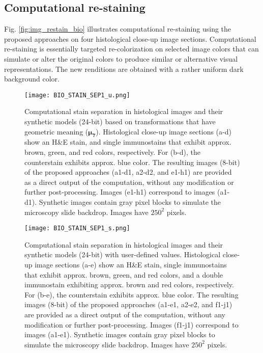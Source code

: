 \documentclass[superscriptaddress,longbibliography,aps,prl,twocolumn,10pt]{revtex4-2}
\begin{document}
\subsection*{\normalsize{Computational re-staining}}
Fig. \ref{fig:img_restain_bio} illustrates computational re-staining using the proposed approaches on four histological close-up image sections. Computational re-staining is essentially targeted re-colorization on selected image colors that can simulate or alter the original colors to produce similar or alternative visual representations. The new renditions are obtained with a rather uniform dark background color.

\begin{figure}[t]
\centering
\texttt{[image: BIO\_STAIN\_SEP1\_u.png]}
\vspace{-12pt}
\caption{\footnotesize{Computational stain separation in histological images and their synthetic models (24-bit) based on transformations that have geometric meaning ($\boldsymbol{\mu_{7}}$). Histological close-up image sections (a-d) show an H\&E stain, and single immunostains that exhibit approx. brown, green, and red colors, respectively. For (b-d), the counterstain exhibits approx. blue color. The resulting images (8-bit) of the proposed approaches (a1-d1, a2-d2, and e1-h1) are provided as a direct output of the computation, without any modification or further post-processing. Images (e1-h1) correspond to images (a1-d1). Synthetic images contain gray pixel blocks to simulate the microscopy slide backdrop. Images have $250^2$ pixels.}}
\label{fig:img_unsupstainsep_bio}
\end{figure}

\begin{figure}[t]
\centering
\texttt{[image: BIO\_STAIN\_SEP1\_s.png]}
\vspace{-12pt}
\caption{\footnotesize{Computational stain separation in histological images and their synthetic models (24-bit) with user-defined values. Histological close-up image sections (a-e) show an H\&E stain, single immunostains that exhibit approx. brown, green, and red colors, and a double immunostain exhibiting approx. brown and red colors, respectively. For (b-e), the counterstain exhibits approx. blue color. The resulting images (8-bit) of the proposed approaches (a1-e1, a2-e2, and f1-j1) are provided as a direct output of the computation, without any modification or further post-processing. Images (f1-j1) correspond to images (a1-e1). Synthetic images contain gray pixel blocks to simulate the microscopy slide backdrop. Images have $250^2$ pixels.}}
\label{fig:img_supstainsep_bio}
\end{figure}
\end{document}
